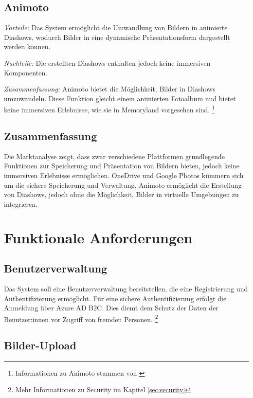 \subsection{Animoto}

\emph{Vorteile:}
Das System ermöglicht die Umwandlung von Bildern in animierte Diashows,
wodurch Bilder in eine dynamische Präsentationsform dargestellt werden
können.

\emph{Nachteile:}
Die erstellten Diashows enthalten jedoch keine immersiven Komponenten.

\emph{Zusammenfassung:}
Animoto bietet die Möglichkeit, Bilder in Diashows umzuwandeln. Diese Funktion gleicht 
einem animierten Fotoalbum und bietet keine immersiven Erlebnisse, wie sie in Memoryland
vorgesehen sind. \footnote{Informationen zu Animoto stammen von \cite{Animoto}}

\subsection{Zusammenfassung}

Die Marktanalyse zeigt, dass zwar verschiedene Plattformen grundlegende 
Funktionen zur Speicherung und Präsentation von Bildern bieten, jedoch 
keine immersiven Erlebnisse ermöglichen. OneDrive und Google Photos kümmern 
sich um die sichere Speicherung und Verwaltung. Animoto ermöglicht die 
Erstellung von Diashows, jedoch ohne die Möglichkeit, Bilder in virtuelle 
Umgebungen zu integrieren.

\section{Funktionale Anforderungen}

\subsection{Benutzerverwaltung}

Das System soll eine Benutzerverwaltung bereitstellen, die eine Registrierung 
und Authentifizierung ermöglicht. Für eine sichere Authentifizierung erfolgt
die Anmeldung über Azure AD B2C. Dies diemt dem Schutz der Daten der Benutzer:innen
vor Zugriff von fremden Personen.
\footnote{Mehr Informationen zu Security im Kapitel \ref{sec:security}}

\subsection{Bilder-Upload}


